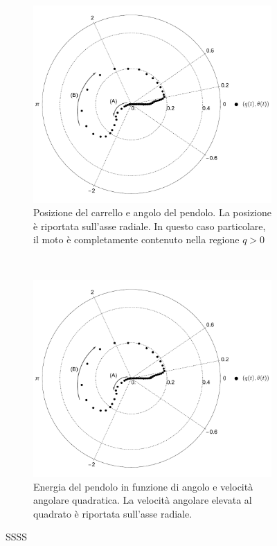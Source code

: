 \begin{figure}
    \centering
    \begin{subfigure}[]{\textwidth}
        \centering
        \includegraphics[width=.75\textwidth]{assets/polar-swingup-real}
        \caption{Posizione del carrello e angolo del pendolo.
        La posizione è riportata sull'asse radiale. In questo
        caso particolare, il moto è
        completamente contenuto nella regione $q > 0$
        }
    \end{subfigure}
    \\[5ex]
    \begin{subfigure}[]{\textwidth}
        \centering
        \includegraphics[width=.75\textwidth]{assets/polar-swingup-real}
        \caption{Energia del pendolo in funzione di angolo e
        velocità angolare quadratica.
        La velocità angolare elevata al quadrato è riportata sull'asse
        radiale.
        }
    \end{subfigure}

    \caption[SSSS]{
        SSSS
    }
    \label{fig:swingup-real-one}
\end{figure}

